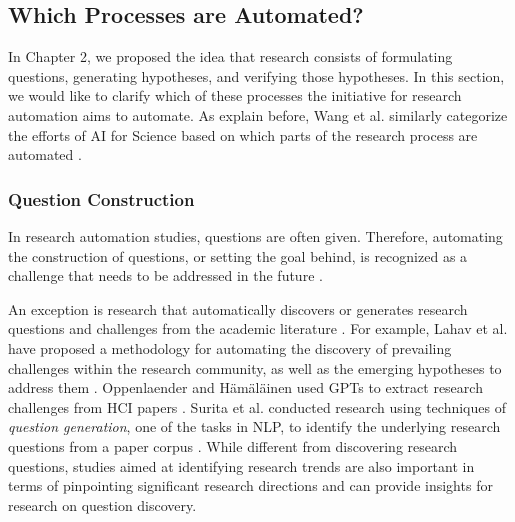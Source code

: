 \subsection{Which Processes are Automated?}
In Chapter 2, we proposed the idea that research consists of formulating questions, generating hypotheses, and verifying those hypotheses. In this section, we would like to clarify which of these processes the initiative for research automation aims to automate. As explain before, Wang et al. similarly categorize the efforts of AI for Science based on which parts of the research process are automated \cite{wang2023scientific}. 


\subsubsection{Question Construction}

In research automation studies, questions are often given. Therefore, automating the construction of questions, or setting the goal behind, is recognized as a challenge that needs to be addressed in the future \cite{coley2020autonomousII,zenil2023,kitano2021nobel}. 

An exception is research that automatically discovers or generates research questions and challenges from the academic literature \cite{lahav2022search,liu2023creative,oppenlaender2023mapping,surita2020can}. For example, Lahav et al. have proposed a methodology for automating the discovery of prevailing challenges within the research community, as well as the emerging hypotheses to address them \cite{lahav2022search}. Oppenlaender and Hämäläinen used GPTs to extract research challenges from HCI papers \cite{oppenlaender2023mapping}. Surita et al. conducted research using techniques of \textit{question generation}, one of the tasks in NLP, to identify the underlying research questions from a paper corpus \cite{surita2020can}. While different from discovering research questions, studies aimed at identifying research trends \cite{krenn2022scientific,krenn2022predicting} are also important in terms of pinpointing significant research directions and can provide insights for research on question discovery.

